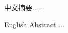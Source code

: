 \fancyfoot[C]{\thepage}

\begin{cabstract}%
  中文摘要......\\

\end{cabstract}




\begin{eabstract}%
  English Abstract ...\\


  
\end{eabstract}

